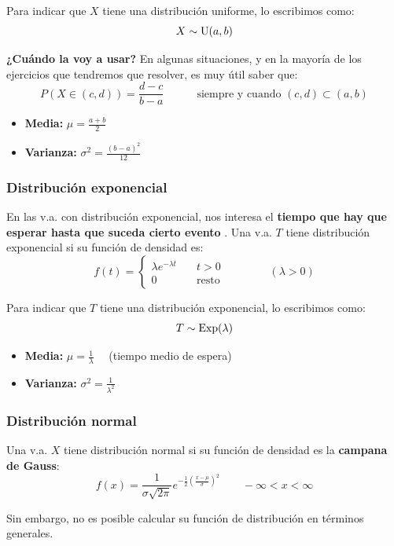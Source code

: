 \documentclass[a4paper]{book}
\begin{document}
Para indicar que $X$ tiene una distribución uniforme, lo escribimos como: \[X\sim \operatorname{U}(a,b)\]

\textbf{¿Cuándo la voy a usar?} En algunas situaciones, y en la mayoría de los ejercicios que tendremos que resolver, es muy útil saber que: \[P\left( X \in (c,d) \right)= \frac{d-c}{b-a} \qquad \quad \text{siempre y cuando }(c,d)\subset (a,b)\]

\begin{itemize}
	\item \textbf{Media:} $\displaystyle{\mu = \frac{a+b}{2}}$
	\item \textbf{Varianza:} $\displaystyle{\sigma ^2 = \frac{\left( b-a \right)^2}{12}}$
\end{itemize}

\subsubsection{Distribución exponencial}
En las v.a. con distribución exponencial, nos interesa el \textbf{tiempo que hay que esperar hasta que suceda cierto evento }. Una v.a. $T$ tiene distribución exponencial si su función de densidad es: \[f(t) = \left\{ \begin{matrix}
		\lambda e^{-\lambda t} & \quad t>0           \\[5pt]
		0                      & \quad  \text{resto}
	\end{matrix} \right.\qquad\qquad  \left( \lambda >0 \right)\]

Para indicar que $T$ tiene una distribución exponencial, lo escribimos como: \[T\sim \operatorname{Exp}(\lambda )\]

\begin{itemize}
	\item \textbf{Media:} $\displaystyle{\mu = \frac{1}{\lambda}}\quad $ (tiempo medio de espera)
	\item \textbf{Varianza:} $\displaystyle{\sigma ^2 = \frac{1}{\lambda ^2}}$
\end{itemize}

\subsubsection{Distribución normal}
Una v.a. $X$ tiene distribución normal si su función de densidad es la \textbf{campana de Gauss}: \[f(x) = \frac{1}{\sigma \sqrt{2\pi}}e^{-\frac{1}{2}\left( \frac{x-\mu }{\sigma} \right)^2} \qquad -\infty <x< \infty \]

Sin embargo, no es posible calcular su función de distribución en términos generales.
\end{document}
